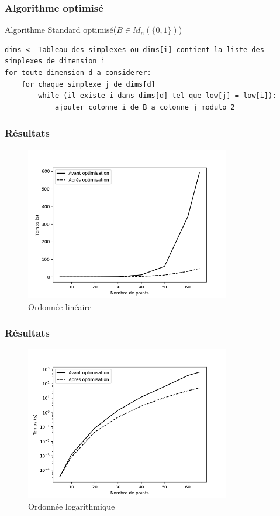 \documentclass{beamer}
\begin{document}
\begin{frame}[fragile]
    \frametitle{Algorithme optimisé}
    \begin{block}{Algorithme Standard optimisé($B \in M_n(\{0,1\})$)}
        \fontsize{9.5}{10}\selectfont
        \begin{lstlisting}
dims <- Tableau des simplexes ou dims[i] contient la liste des simplexes de dimension i
for toute dimension d a considerer:
    for chaque simplexe j de dims[d]
        while (il existe i dans dims[d] tel que low[j] = low[i]):
            ajouter colonne i de B a colonne j modulo 2
      \end{lstlisting}
    \end{block}
\end{frame}

\begin{frame}
    \frametitle{Résultats}
    \begin{figure}%
        \centering
        \includegraphics[width=0.8\textwidth]{../images/analyse_cmpx.png}
        \caption{Ordonnée linéaire}
    \end{figure}
\end{frame}

\begin{frame}
    \frametitle{Résultats}
    \begin{figure}%
        \centering
        \includegraphics[width=0.8\textwidth]{../images/analyse_cmpx_log.png}
        \caption{Ordonnée logarithmique}
    \end{figure}
\end{frame}
\end{document}
